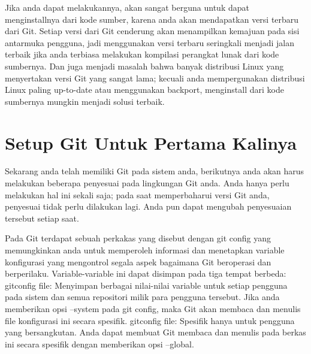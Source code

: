 {{\vspace{\baselineskip}
\noindent 
{\fontsize{14pt}{14pt}\selectfont Jika anda dapat melakukannya, akan sangat berguna untuk dapat menginstallnya dari kode sumber, karena anda akan mendapatkan versi terbaru dari Git. Setiap versi dari Git cenderung akan menampilkan kemajuan pada sisi antarmuka pengguna, jadi menggunakan versi terbaru seringkali menjadi jalan terbaik jika anda terbiasa melakukan kompilasi perangkat lunak dari kode sumbernya. Dan juga menjadi masalah bahwa banyak distribusi Linux yang menyertakan versi Git yang sangat lama; kecuali anda mempergunakan distribusi Linux paling up-to-date atau menggunakan backport, menginstall dari kode sumbernya mungkin menjadi solusi terbaik. \\} \par

\vspace{\baselineskip}
\vspace{14pt}
\noindent 
{\fontsize{14pt}{14pt}\section {Setup Git Untuk Pertama Kalinya}
	\vspace{\baselineskip}
\noindent 
{\fontsize{14pt}{14pt}\selectfont Sekarang anda telah memiliki Git pada sistem anda, berikutnya anda akan harus melakukan beberapa penyesuai pada lingkungan Git anda. Anda hanya perlu melakukan hal ini sekali saja; pada saat memperbaharui versi Git anda, penyesuai tidak perlu dilakukan lagi. Anda pun dapat mengubah penyesuaian tersebut setiap saat. \\} \par

\vspace{\baselineskip}
\noindent 
{\fontsize{14pt}{14pt}\selectfont Pada Git terdapat sebuah perkakas yang disebut dengan git config yang memungkinkan anda untuk memperoleh informasi dan menetapkan variable konfigurasi yang mengontrol segala aspek bagaimana Git beroperasi dan berperilaku. Variable-variable ini dapat disimpan pada tiga tempat berbeda: gitconfig $  $file: Menyimpan berbagai nilai-nilai variable untuk setiap pengguna pada sistem dan semua repositori milik para pengguna tersebut. Jika anda memberikan opsi $  $--system $  $pada $  $git config, maka Git akan membaca dan menulis file konfigurasi ini secara spesifik. gitconfig $  $file: Spesifik hanya untuk pengguna yang bersangkutan. Anda dapat membuat Git membaca dan menulis pada berkas ini secara spesifik dengan memberikan opsi $  $--global. \\} \par

}}}
